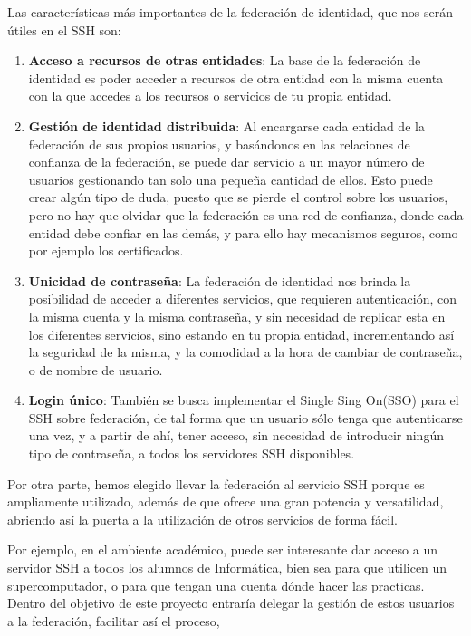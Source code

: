 Las características más importantes de la federación de identidad, que
nos serán útiles en el SSH son:
\begin{enumerate}

    \item \textbf{Acceso a recursos de otras entidades}: La base de la
    federación de identidad es poder acceder a recursos de otra
    entidad con la misma cuenta con la que accedes a los recursos o
    servicios de tu propia entidad.

    \item \textbf{Gestión de identidad distribuida}: Al encargarse
    cada entidad de la federación de sus propios usuarios, y
    basándonos en las relaciones de confianza de la federación, se
    puede dar servicio a un mayor número de usuarios gestionando tan
    solo una pequeña cantidad de ellos. Esto puede crear algún tipo de
    duda, puesto que se pierde el control sobre los usuarios, pero no
    hay que olvidar que la federación es una red de confianza, donde
    cada entidad debe confiar en las demás, y para ello hay mecanismos
    seguros, como por ejemplo los certificados.

    \item \textbf{Unicidad de contraseña}: La federación de identidad
    nos brinda la posibilidad de acceder a diferentes servicios, que
    requieren autenticación, con la misma cuenta y la misma
    contraseña, y sin necesidad de replicar esta en los diferentes
    servicios, sino estando en tu propia entidad, incrementando así la
    seguridad de la misma, y la comodidad a la hora de cambiar de
    contraseña, o de nombre de usuario.

    \item \textbf{Login único}: También se busca implementar el Single
    Sing On(SSO) para el SSH sobre federación, de tal forma que un
    usuario sólo tenga que autenticarse una vez, y a partir de ahí,
    tener acceso, sin necesidad de introducir ningún tipo de
    contraseña, a todos los servidores SSH disponibles.

\end{enumerate}

Por otra parte, hemos elegido llevar la federación al servicio SSH
porque es ampliamente utilizado, además de que ofrece una gran
potencia y versatilidad, abriendo así la puerta a la utilización de
otros servicios de forma fácil.

Por ejemplo, en el ambiente académico, puede ser interesante dar
acceso a un servidor SSH a todos los alumnos de Informática, bien sea
para que utilicen un supercomputador, o para que tengan una cuenta
dónde hacer las practicas. Dentro del objetivo de este proyecto
entraría delegar la gestión de estos usuarios a la federación,
facilitar así el proceso, 


